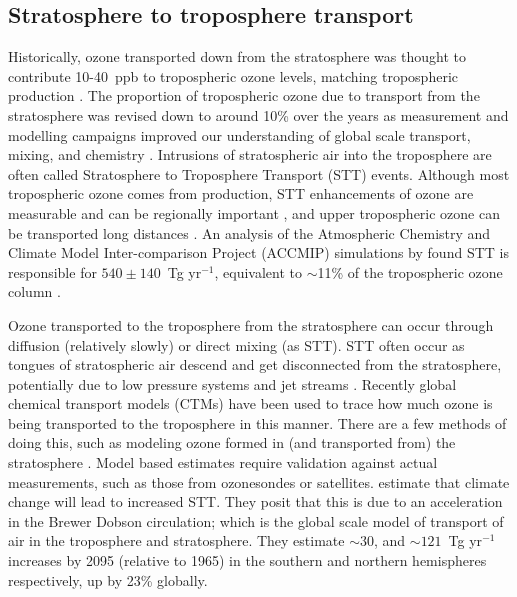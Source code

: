   \subsection{Stratosphere to troposphere transport}
    \label{LR:O3:STT}
    Historically, ozone transported down from the stratosphere was thought to contribute 10-40~ppb to tropospheric ozone levels, matching tropospheric production \parencite{Atkinson2000, Stohl2003}.
    The proportion of tropospheric ozone due to transport from the stratosphere was revised down to around 10\% over the years as measurement and modelling campaigns improved our understanding of global scale transport, mixing, and chemistry \parencite{Guenther2006,Monks2015}.
    Intrusions of stratospheric air into the troposphere are often called Stratosphere to Troposphere Transport (STT) events.
    Although most tropospheric ozone comes from production, STT enhancements of ozone are measurable and can be regionally important \parencite[eg.]{Jacobson2000,Lelieveld2009,Kuang2017}, and upper tropospheric ozone can be transported long distances \parencite{Cooper2004}.
    An analysis of the Atmospheric Chemistry and Climate Model Inter-comparison Project (ACCMIP) simulations by \textcite{Young2013} found STT is responsible for $540\pm140$~Tg yr$^{-1}$, equivalent to $\sim$11\% of the tropospheric ozone column \parencite{Monks2015}.
    
    
    Ozone transported to the troposphere from the stratosphere can occur through diffusion (relatively slowly) or direct mixing (as STT).
    STT often occur as tongues of stratospheric air descend and get disconnected from the stratosphere, potentially due to low pressure systems and jet streams \parencite{Sprenger2003}.
    Recently global chemical transport models (CTMs) have been used to trace how much ozone is being transported to the troposphere in this manner.
    There are a few methods of doing this, such as modeling ozone formed in (and transported from) the stratosphere \parencite{Ojha2016}.
    Model based estimates require validation against actual measurements, such as those from ozonesondes or satellites.
    \textcite{Hegglin2009} estimate that climate change will lead to increased STT.
    They posit that this is due to an acceleration in the Brewer Dobson circulation; which is the global scale model of transport of air in the troposphere and stratosphere.
    They estimate $\sim 30$, and $\sim 121$~Tg yr$^{-1}$ increases by 2095 (relative to 1965) in the southern and northern hemispheres respectively, up by 23\% globally.
    
